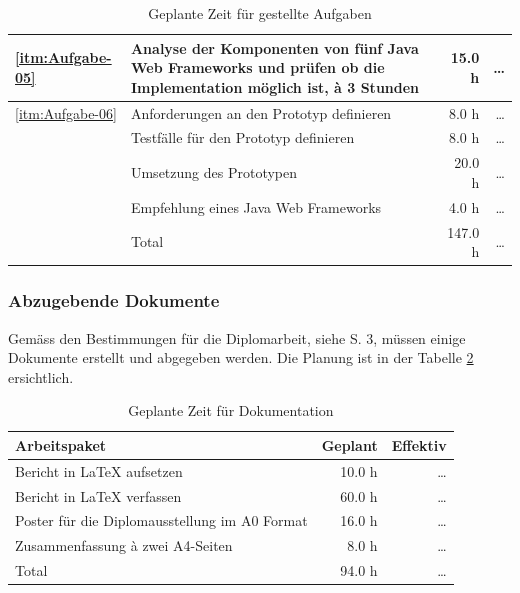 \begin{table}[!h]
\begin{center}
\begin{tabular}{lp{7cm}rr}
        \midrule
        \ref{itm:Aufgabe-05} &
        Analyse der Komponenten von fünf Java Web Frameworks und prüfen ob die
        Implementation möglich ist, à 3 Stunden &
        15.0 h &
        \ldots\\
        
        \midrule
        \ref{itm:Aufgabe-06} &
        Anforderungen an den Prototyp definieren &
        8.0 h &
        \ldots\\
        &
        Testfälle für den Prototyp definieren &
        8.0 h &
        \ldots\\
        &
        Umsetzung des Prototypen &
        20.0 h &
        \ldots\\
        &
        Empfehlung eines Java Web Frameworks &
        4.0 h &
        \ldots\\
        \bottomrule
        &
        Total &
        147.0 h &
        \ldots\\
        \bottomrule
      \end{tabular}
      \caption{Geplante Zeit für gestellte Aufgaben}
      \label{tab:aufgabenPlaning}
    \end{center}
  \end{table}
  
  \newpage
  
  \subsubsection{Abzugebende Dokumente}
  
  Gemäss den Bestimmungen für die Diplomarbeit, siehe \cite{hsz_reglement} S. 3,
  müssen einige Dokumente erstellt und abgegeben werden. Die Planung ist in der
  Tabelle \ref{tab:documentationPlaning} ersichtlich.
  \newline
  
  \begin{table}[ht]
    \begin{center}
      \begin{tabular}{p{9cm}rr}
        \toprule
        Arbeitspaket & Geplant & Effektiv \\
        \midrule
        Bericht in \LaTeX{} aufsetzen &
        10.0 h &
        \ldots\\
        Bericht in \LaTeX{} verfassen &
        60.0 h &
        \ldots\\
        Poster für die Diplomausstellung im A0 Format &
        16.0 h &
        \ldots\\
        Zusammenfassung à zwei A4-Seiten &
        8.0 h &
        \ldots\\
        \bottomrule
        Total &
        94.0 h &
        \ldots\\
        \bottomrule
      \end{tabular}
      \caption{Geplante Zeit für Dokumentation}
      \label{tab:documentationPlaning}
    \end{center}
  \end{table}
  
